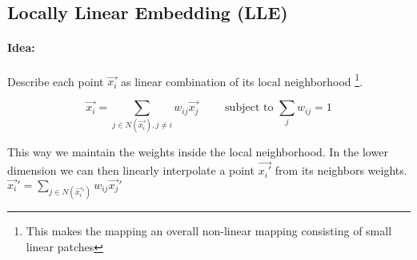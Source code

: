 

\subsection*{Locally Linear Embedding (LLE)}

\paragraph{Idea:} Describe each point \(\vec{x_i}\) as linear combination of its local neighborhood \footnote{ This makes the mapping an overall non-linear mapping consisting of small linear patches}.

\[\vec{x_i} = \sum_{j \in N(\vec{x_i}), j \neq i} w_{ij} \vec{x_j} \qquad \text{ subject to } \sum_j w_{ij} = 1\]

This way we maintain the weights inside the local neighborhood. In the lower dimension we can then linearly interpolate a point \(\vec{x_{i}'}\) from its neighbors weights. $\vec{x_i}' = \sum_{j \in N(\vec{x_i}')} w_{ij} \vec{x_j}'$


